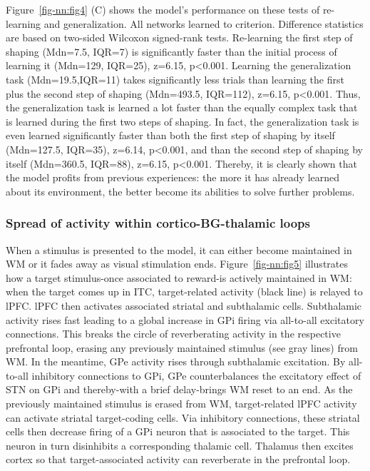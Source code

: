 \documentclass[
  11pt,
  a4paper,
]{scrbook}
\begin{document}
Figure~\ref{fig-nn:fig4} (C) shows the model's performance on these
tests of re-learning and generalization. All networks learned to
criterion. Difference statistics are based on two-sided Wilcoxon
signed-rank tests. Re-learning the first step of shaping (Mdn=7.5,
IQR=7) is significantly faster than the initial process of learning it
(Mdn=129, IQR=25), z=6.15, p\textless0.001. Learning the generalization
task (Mdn=19.5,IQR=11) takes significantly less trials than learning the
first plus the second step of shaping (Mdn=493.5, IQR=112), z=6.15,
p\textless0.001. Thus, the generalization task is learned a lot faster
than the equally complex task that is learned during the first two steps
of shaping. In fact, the generalization task is even learned
significantly faster than both the first step of shaping by itself
(Mdn=127.5, IQR=35), z=6.14, p\textless0.001, and than the second step
of shaping by itself (Mdn=360.5, IQR=88), z=6.15, p\textless0.001.
Thereby, it is clearly shown that the model profits from previous
experiences: the more it has already learned about its environment, the
better become its abilities to solve further problems.

\subsubsection*{Spread of activity within cortico-BG-thalamic
loops}\label{spread-of-activity-within-cortico-bg-thalamic-loops}

When a stimulus is presented to the model, it can either become
maintained in WM or it fades away as visual stimulation ends.
Figure~\ref{fig-nn:fig5} illustrates how a target stimulus-once
associated to reward-is actively maintained in WM: when the target comes
up in ITC, target-related activity (black line) is relayed to lPFC. lPFC
then activates associated striatal and subthalamic cells. Subthalamic
activity rises fast leading to a global increase in GPi firing via
all-to-all excitatory connections. This breaks the circle of
reverberating activity in the respective prefrontal loop, erasing any
previously maintained stimulus (see gray lines) from WM. In the
meantime, GPe activity rises through subthalamic excitation. By
all-to-all inhibitory connections to GPi, GPe counterbalances the
excitatory effect of STN on GPi and thereby-with a brief delay-brings WM
reset to an end. As the previously maintained stimulus is erased from
WM, target-related lPFC activity can activate striatal target-coding
cells. Via inhibitory connections, these striatal cells then decrease
firing of a GPi neuron that is associated to the target. This neuron in
turn disinhibits a corresponding thalamic cell. Thalamus then excites
cortex so that target-associated activity can reverberate in the
prefrontal loop.
\end{document}
